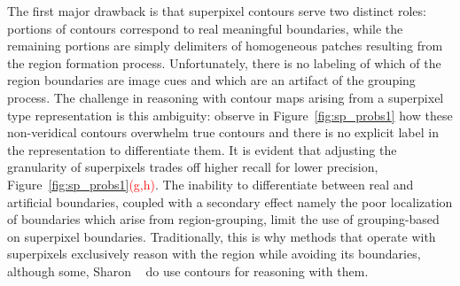 The first major drawback is that superpixel contours serve two distinct roles: portions of contours correspond to real meaningful boundaries, while the remaining portions are simply delimiters of homogeneous patches resulting from the region formation process. Unfortunately, there is no labeling of which of the region boundaries are image cues and which are an artifact of the grouping process. The challenge in reasoning with contour maps arising from a superpixel type representation is this ambiguity: observe in Figure~\ref{fig:sp_probs1} how these non-veridical contours overwhelm true contours and there is no explicit label in the representation to differentiate them. It is evident that adjusting the granularity of superpixels trades off higher recall for lower precision, Figure~\ref{fig:sp_probs1}\textcolor{red}{(g,h)}. The inability to differentiate between real and artificial boundaries, coupled with a secondary effect namely the poor localization of boundaries which arise from region-grouping, limit the use of grouping-based on superpixel boundaries. Traditionally, this is why methods that operate with superpixels exclusively reason with the region while avoiding its boundaries, although some, \eg Sharon \etal ~\cite{Alpert:etal:CVPR07} do use contours for reasoning with them. 


